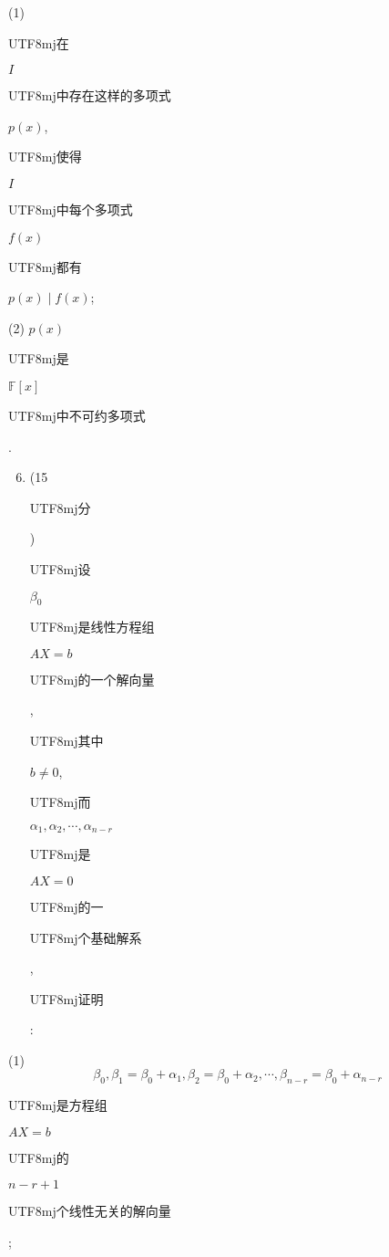 \documentclass[10pt]{article}
\begin{document}
(1) \begin{CJK}{UTF8}{mj}在\end{CJK} $I$ \begin{CJK}{UTF8}{mj}中存在这样的多项式\end{CJK} $p(x)$, \begin{CJK}{UTF8}{mj}使得\end{CJK} $I$ \begin{CJK}{UTF8}{mj}中每个多项式\end{CJK} $f(x)$ \begin{CJK}{UTF8}{mj}都有\end{CJK} $p(x) \mid f(x)$;

(2) $p(x)$ \begin{CJK}{UTF8}{mj}是\end{CJK} $\mathbb{F}[x]$ \begin{CJK}{UTF8}{mj}中不可约多项式\end{CJK}.

\begin{enumerate}
  \setcounter{enumi}{5}
  \item (15 \begin{CJK}{UTF8}{mj}分\end{CJK}) \begin{CJK}{UTF8}{mj}设\end{CJK} $\beta_{0}$ \begin{CJK}{UTF8}{mj}是线性方程组\end{CJK} $A X=b$ \begin{CJK}{UTF8}{mj}的一个解向量\end{CJK}, \begin{CJK}{UTF8}{mj}其中\end{CJK} $b \neq 0$, \begin{CJK}{UTF8}{mj}而\end{CJK} $\alpha_{1}, \alpha_{2}, \cdots, \alpha_{n-r}$ \begin{CJK}{UTF8}{mj}是\end{CJK} $A X=0$ \begin{CJK}{UTF8}{mj}的一\end{CJK} \begin{CJK}{UTF8}{mj}个基础解系\end{CJK}, \begin{CJK}{UTF8}{mj}证明\end{CJK}:
\end{enumerate}
(1)
$$
\beta_{0}, \beta_{1}=\beta_{0}+\alpha_{1}, \beta_{2}=\beta_{0}+\alpha_{2}, \cdots, \beta_{n-r}=\beta_{0}+\alpha_{n-r}
$$
\begin{CJK}{UTF8}{mj}是方程组\end{CJK} $A X=b$ \begin{CJK}{UTF8}{mj}的\end{CJK} $n-r+1$ \begin{CJK}{UTF8}{mj}个线性无关的解向量\end{CJK};
\end{document}
